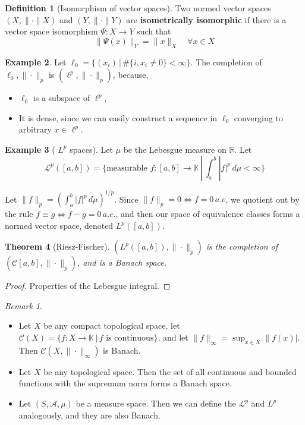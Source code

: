 \documentclass[10pt, oneside, reqno]{amsbook}
\theoremstyle{plain}%
\newtheorem{thm}{Theorem}[section]
\theoremstyle{definition}
\newtheorem{defn}[thm]{Definition}
\newtheorem{exmp}[thm]{Example}
\theoremstyle{remark}
\newtheorem*{rem}{Remark}
\newcommand{\R}{\mathbb{R}}
\newcommand{\K}{\mathbb{K}}
\begin{document}
\begin{defn}[Isomorphism of vector spaces]
    Two normed vector spaces $(X, \| \cdot \|X)$ and $(Y, \| \cdot \|Y)$ are \textbf{isometrically isomorphic} if there is a vector space isomorphism $\Psi: X \rightarrow Y$ such that \[
        \| \Psi(x) \|_Y = \| x \|_X \quad \forall x \in X
    \]
\end{defn}

\begin{exmp}
    Let $\ell_0 = \{ (x_i) \, | \, \# \{ i, x_i \neq 0 \} < \infty \}$.  The completion of $\ell_0, \| \cdot \|_p$ is $(\ell^p, \| \cdot \|_p )$, because,
    \begin{itemize}
        \item $\ell_0$ is a subspace of $\ell^p$,
        \item It is dense, since we can easily construct a sequence in $\ell_0$ converging to arbitrary $x \in \ell^p$.
    \end{itemize}
\end{exmp}
\begin{exmp}[ $L^p$ spaces]
    Let $\mu$ be the Lebesgue measure on $\R$.  Let \[
        \mathcal{L}^p([a,b]) = \{ \text{measurable } f: [a,b] \rightarrow \K \, | \, \int_a^b |f|^p \, d \mu < \infty \}
    \]
    
    Let $\| f \|_p = \left( \int_a^b |f|^p \, d \mu \right)^{1/p}$.  Since $\| f \|_p = 0 \iff f = 0 \, a.e$, we quotient out by the rule $f \equiv g \iff f - g = 0 \, a.e.$, and then our space of equivalence classes forms a normed vector space, denoted $L^p([a,b])$.
\end{exmp}

\begin{thm}[Riesz-Fischer] $(L^p([a,b]), \| \cdot \|_p )$ is the completion of $(\mathcal{C}[a,b], \| \cdot \|_p )$, and is a Banach space.
\end{thm}
\begin{proof}
    Properties of the Lebesgue integral.
\end{proof}

\begin{rem}{\ }
    \begin{itemize}
        \item Let $X$ be any compact topological space, let $\mathcal{C}(X) = \{ f : X \rightarrow \K \, | \, \text{$f$ is continuous} \}$, and let $\|f \|_\infty = \sup_{x \in X} \|f(x)|$.  Then $\mathcal{C}(X, \| \cdot \|_\infty)$ is Banach.  
        \item Let $X$ be any topological space.  Then the set of all continuous and bounded functions with the supremum norm forms a Banach space.
        \item Let $(S, \mathcal{A}, \mu)$ be a measure space.  Then we can define the $\mathcal{L}^p$ and $L^p$ analogously, and they are also Banach.
    \end{itemize}
\end{rem}
\end{document}
